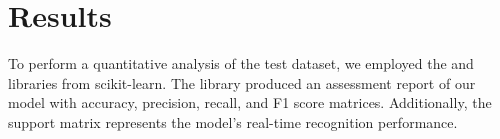 %
%
%
%
%
%
%
%


\section{Results}

To perform a quantitative analysis of the test dataset, we employed the  and  libraries from scikit-learn. The  library produced an assessment report of our model with accuracy, precision, recall, and F1 score matrices. Additionally, the support matrix represents the model's real-time recognition performance.

